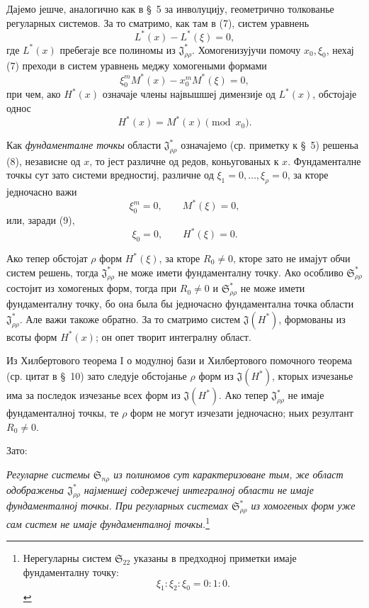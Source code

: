 ﻿\documentclass[11pt]{article}
\providecommand{\Ssys}{\mathfrak{S}}
\providecommand{\Jdom}{\mathfrak{J}}
\begin{document}
Дајемо јешче, аналогично как в \S\ 5 за инволуцију, геометрично толкованье регуларных системов. За то сматримо, как там в (7), систем уравнень
\begin{equation}
  L^*(x)-L^*(\xi)=0,
\tag{7}
\end{equation}
где $L^*(x)$ пребегаје все полиномы из $\Jdom^*_{\rho\rho}$. Хомогенизујучи помочу $x_0,\xi_0$, нехај (7) преходи в систем уравнень меджу хомогеными формами
\begin{equation}
  \xi_0^{m}M^*(x)-x_0^{m}M^*(\xi)=0,
\tag{8}
\end{equation}
при чем, ако $H^*(x)$ означаје члены највышшеј димензије од $L^*(x)$, обстојаје однос
\begin{equation}
  H^*(x)=M^*(x)\pmod{x_0}.
\tag{9}
\end{equation}

Как {\itshape фундаменталне точкы} области $\Jdom^*_{\rho\rho}$ означајемо (ср. приметку к \S\ 5) решеньа (8), независне од $x$, то јест различне од редов, коньугованых к $x$. Фундаменталне точкы сут зато системи вредностиј, различне од $\xi_1=0,\ldots,\xi_\rho=0$, за кторе једночасно важи
\[
  \xi_0^m=0,\qquad M^*(\xi)=0,
\]
или, заради (9),
\[
  \xi_0=0,
  \qquad H^*(\xi)=0.
\]

Ако тепер обстојат $\rho$ форм $H^*(\xi)$, за кторе $R_0\ne0$, кторе зато не имајут обчи систем решень, тогда $\Jdom^*_{\rho\rho}$ не може имети фундаменталну точку. Ако особливо $\Ssys^*_{\rho\rho}$ состојит из хомогеных форм, тогда при $R_0\ne0$ и $\Ssys^*_{\rho\rho}$ не може имети фундаменталну точку, бо она была бы једночасно фундаментална точка области $\Jdom^*_{\rho\rho}$. Але важи такоже обратно. За то сматримо систем $\Jdom(H^*)$, формованы из всоты форм $H^*(x)$; он опет творит интегралну област.

Из Хилбертового теорема I о модулној бази и Хилбертового помочного теорема (ср. цитат в \S\ 10) зато следује обстојанье $\rho$ форм из $\Jdom(H^*)$, кторых изчезанье има за последок изчезанье всех форм из $\Jdom(H^*)$. Ако тепер $\Jdom^*_{\rho\rho}$ не имаје фундаменталној точкы, те $\rho$ форм не могут изчезати једночасно; ньих резултант $R_0\ne0$.

Зато:

{\itshape Регуларне системы $\Ssys_{n\rho}$ из полиномов сут карактеризоване тым, же област одображеньа $\Jdom^*_{\rho\rho}$ најменшеј содержечеј интегралној области не имаје фундаменталној точкы. При регуларных системах $\Ssys^*_{\rho\rho}$ из хомогеных форм уже сам систем не имаје фундаменталној точкы.}\footnote{Нерегуларны систем $\Ssys_{22}$ указаны в предходној приметки имаје фундаменталну точку:
\[
  \xi_1:\xi_2:\xi_0=0:1:0.
\]}
\end{document}
